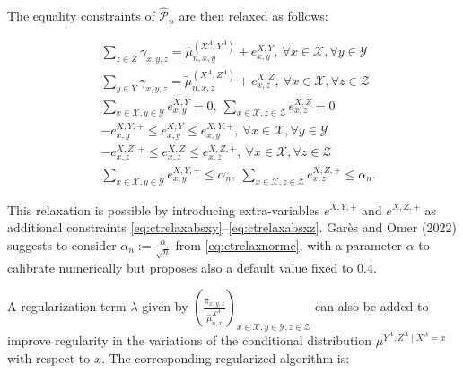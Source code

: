 The equality constraints of \(\widehat{\mathcal{P}}_n\) are then relaxed as follows:

\begin{align}
            & \sum_{z\in Z} \gamma_{x,y,z} = \hat{\mu}^{(X^A,Y^A)}_{n,x,y} + e^{X,Y}_{x,y}, \:\forall x\in\mathcal{X}, \forall y\in \mathcal{Y}    \label{eq:relaxationxy}\\
            & \sum_{y\in Y} \gamma_{x,y,z} = \tilde{\mu}^{(X^A,Z^A)}_{n,x,z} + e^{X,Z}_{x,z}, \:\forall x\in\mathcal{X}, \forall z\in \mathcal{Z}    \label{eq:relaxationxz}\\
            & \sum_{x\in \mathcal{X},y\in \mathcal{Y}} e^{X,Y}_{x,y} = 0,\: \sum_{x\in \mathcal{X},z\in \mathcal{Z}} e^{X,Z}_{x,z} = 0     \label{eq:relaxsum}\\
            & -e^{X,Y,+}_{x,y}\leq e^{X,Y}_{x,y} \leq e^{X,Y,+}_{x,y}, \:\forall x\in\mathcal{X}, \forall y\in \mathcal{Y}    \label{eq:ctrelaxabsxy}\\
            & -e^{X,Z,+}_{x,z}\leq e^{X,Z}_{x,z} \leq e^{X,Z,+}_{x,z}, \:\forall x\in\mathcal{X}, \forall z\in \mathcal{Z}    \label{eq:ctrelaxabsxz}\\
            & \sum_{x\in \mathcal{X},y\in \mathcal{Y}} e^{X,Y,+}_{x,y} \leq \alpha_n,\: \sum_{x\in \mathcal{X},z\in \mathcal{Z}} e^{X,Z,+}_{x,z} \leq \alpha_n.  \label{eq:ctrelaxnorme}
\end{align}

This relaxation is possible by introducing extra-variables \(e^{X,Y,+}\) and \(e^{X,Z,+}\) as additional constraints \eqref{eq:ctrelaxabsxy}--\eqref{eq:ctrelaxabsxz}.
Garès and Omer (2022) suggests to consider \(\alpha_n:=\frac{\alpha}{\sqrt{n}}\) from \eqref{eq:ctrelaxnorme}, with a parameter \(\alpha\) to calibrate numerically but proposes also a default value fixed to \(0.4\).

A regularization term \(\lambda\) given by \((\frac{\pi_{x,y,z}}{\hat{\mu}^{X^A}_{n,x}})_{x\in\mathcal{X},y\in\mathcal{Y},z\in\mathcal{Z}}\) can also be added to improve regularity in the variations of the conditional distribution \(\mu^{Y^A,Z^A\mid X^A=x}\) with respect to \(x\). The corresponding regularized algorithm is:

